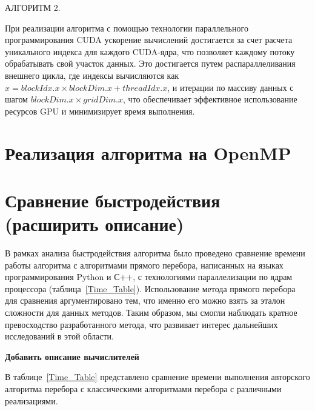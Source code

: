 \documentclass[10pt]{article}
\begin{document}
	АЛГОРИТМ 2.
	
	При реализации алгоритма с помощью технологии параллельного программирования CUDA ускорение вычислений достигается за счет расчета уникального индекса для каждого CUDA-ядра, что позволяет каждому потоку обрабатывать свой участок данных. Это достигается путем распараллеливания внешнего цикла, где индексы вычисляются как $x = blockIdx.x \times blockDim.x + threadIdx.x$, и итерации по массиву данных с шагом $blockDim.x \times gridDim.x$, что обеспечивает эффективное использование ресурсов GPU и минимизирует время выполнения.
	
	
	
	\section{Реализация алгоритма на OpenMP}
	
	
	
	
	\section{Сравнение быстродействия (расширить описание)}
	В рамках анализа быстродействия алгоритма было проведено сравнение времени работы алгоритма с алгоритмами прямого перебора, написанных на языках программирования Python и С++, с технологиями параллелизации по ядрам процессора (таблица~\ref{Time_Table}). Использование метода прямого перебора для сравнения аргументировано тем, что именно его можно взять за эталон сложности для данных методов. Таким образом, мы смогли наблюдать кратное превосходство разработанного метода, что развивает интерес дальнейших исследований в этой области.
	
	
	\textbf{Добавить описание вычислителей}
	
	
	В таблице~\ref{Time_Table} представлено сравнение времени выполнения авторского алгоритма перебора с классическими алгоритмами перебора с различными реализациями.
	
\end{document}
